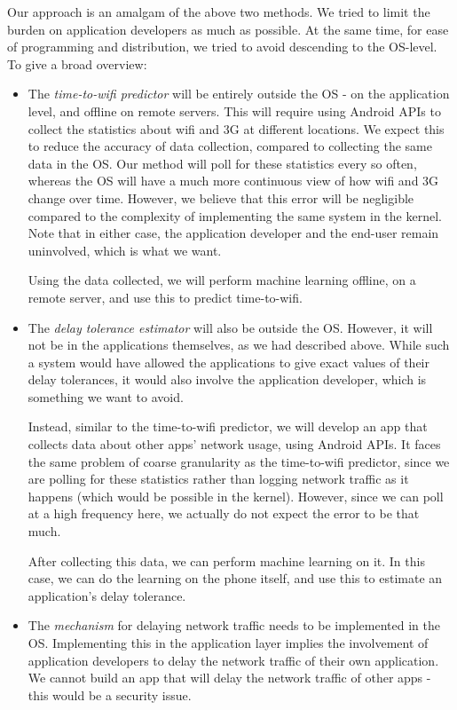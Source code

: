 \documentclass[12pt, fleqn]{article}
\begin{document}
Our approach is an amalgam of the above two methods. We tried to limit the 
burden on application developers as much as possible. At the same time, for ease 
of programming and distribution, we tried to avoid descending to the OS-level. 
To give a broad overview:
\begin{itemize}
  \item The \emph{time-to-wifi predictor} will be entirely outside the OS - 
  on the application level, and offline on remote servers. 
  This will require using Android APIs to collect the statistics about wifi and 
  3G at different locations. We expect this to reduce the accuracy of data collection, 
  compared to collecting the same data in the OS. Our method will poll for 
  these statistics every so often, whereas the OS will have a much more 
  continuous view of how wifi and 3G change over time. However, we believe that this 
  error will be negligible compared to the complexity of implementing the same 
  system in the kernel. Note that in either case, the application developer and 
  the end-user remain uninvolved, which is what we want.
  
  Using the data collected, we will perform machine learning offline, on a 
  remote server, and use this to predict time-to-wifi.
  
  \item The \emph{delay tolerance estimator} will also be outside the OS. 
  However, it will not be in the applications themselves, as we had described 
  above. While such a system would have allowed the applications to give exact 
  values of their delay tolerances, it would also involve the application 
  developer, which is something we want to avoid. 
  
  Instead, similar to the time-to-wifi predictor, we will develop an app that 
  collects data about other apps' network usage, using 
  Android APIs. It faces the same problem of coarse granularity as the 
  time-to-wifi predictor, since we are polling for these statistics rather than 
  logging network traffic as it happens (which would be possible in the kernel). 
  However, since we can poll at a high frequency here, we actually do 
  not expect the error to be that much. 
  
  After collecting this data, we can perform machine learning on it. In this 
  case, we can do the learning on the phone itself, and use this to estimate an 
  application's delay tolerance. 
  
  \item The \emph{mechanism} for delaying network traffic needs to be 
  implemented in the OS. Implementing this in the application layer implies
  the involvement of application developers to delay the network traffic of 
  their own application. We cannot build an app that will delay the network
  traffic of other apps - this would be a security issue.
  

\end{itemize}
\end{document}
